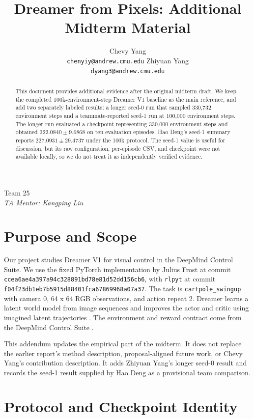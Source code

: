 \documentclass{article}
\title{Dreamer from Pixels: Additional Midterm Material}
\author{%
  Chevy Yang \\
  \texttt{chenyiy@andrew.cmu.edu}
  \And
  Zhiyuan Yang \\
  \texttt{dyang3@andrew.cmu.edu}
}
\begin{document}
\maketitle

\begin{center}
Team 25 \\
\textit{TA Mentor: Kangping Liu}
\end{center}

\begin{abstract}
This document provides additional evidence after the original midterm draft. We keep the completed 100k-environment-step Dreamer V1 baseline as the main reference, and add two separately labeled results: a longer seed-0 run that sampled 330,732 environment steps and a teammate-reported seed-1 run at 100,000 environment steps. The longer run evaluated a checkpoint representing 330,000 environment steps and obtained $322.0840 \pm 9.6868$ on ten evaluation episodes. Hao Deng's seed-1 summary reports $227.0931 \pm 29.4737$ under the 100k protocol. The seed-1 value is useful for discussion, but its raw configuration, per-episode CSV, and checkpoint were not available locally, so we do not treat it as independently verified evidence.
\end{abstract}

\section{Purpose and Scope}

Our project studies Dreamer V1 for visual control in the DeepMind Control Suite. We use the fixed PyTorch implementation by Julius Frost at commit \texttt{ccea6ae4a397a94c328891bd78e81d52dd156cb6}, with \texttt{rlpyt} at commit \texttt{f04f23db1eb7b5915d88401fca67869968a07a37}. The task is \texttt{cartpole\_swingup} with camera 0, 64 x 64 RGB observations, and action repeat 2. Dreamer learns a latent world model from image sequences and improves the actor and critic using imagined latent trajectories \citep{hafner2020dream}. The environment and reward contract come from the DeepMind Control Suite \citep{tassa2018dmcontrol}.

This addendum updates the empirical part of the midterm. It does not replace the earlier report's method description, proposal-aligned future work, or Chevy Yang's contribution description. It adds Zhiyuan Yang's longer seed-0 result and records the seed-1 result supplied by Hao Deng as a provisional team comparison.

\section{Protocol and Checkpoint Identity}
\end{document}
